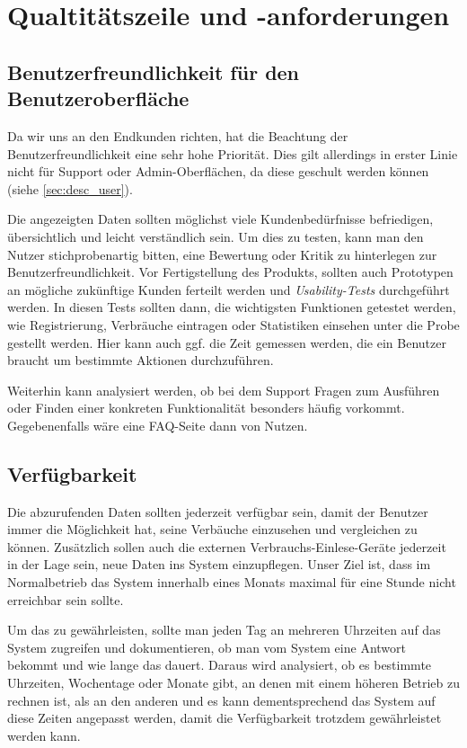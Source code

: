 \section{Qualtitätszeile und -anforderungen}

\subsection{Benutzerfreundlichkeit für den Benutzeroberfläche}
Da wir uns an den Endkunden richten, hat die Beachtung der Benutzerfreundlichkeit eine sehr hohe Priorität. Dies gilt allerdings in erster Linie nicht für Support oder Admin-Oberflächen, da diese geschult werden können (siehe \ref{sec:desc_user}).

Die angezeigten Daten sollten möglichst viele Kundenbedürfnisse
befriedigen, übersichtlich und leicht verständlich sein.
Um dies zu testen, kann man den Nutzer stichprobenartig bitten, eine Bewertung oder Kritik zu hinterlegen zur Benutzerfreundlichkeit.
Vor Fertigstellung des Produkts, sollten auch Prototypen an mögliche zukünftige Kunden ferteilt werden und \textit{Usability-Tests} durchgeführt werden. In diesen Tests sollten dann, die wichtigsten Funktionen getestet werden, wie Registrierung, Verbräuche eintragen oder Statistiken einsehen unter die Probe gestellt werden.
Hier kann auch ggf. die Zeit gemessen werden, die ein Benutzer braucht um bestimmte Aktionen durchzuführen.

Weiterhin kann analysiert werden, ob bei dem Support Fragen zum Ausführen oder Finden einer konkreten Funktionalität besonders häufig vorkommt. Gegebenenfalls wäre eine FAQ-Seite dann von Nutzen.

\subsection{Verfügbarkeit}
Die abzurufenden Daten sollten jederzeit verfügbar sein,
damit der Benutzer immer die Möglichkeit hat,
seine Verbäuche einzusehen und vergleichen zu können. Zusätzlich sollen auch die externen Verbrauchs-Einlese-Geräte jederzeit in der Lage sein, neue Daten ins System einzupflegen.
Unser Ziel ist, dass im Normalbetrieb das System innerhalb eines Monats maximal für eine Stunde nicht erreichbar sein sollte.

Um das zu gewährleisten, sollte man jeden Tag an mehreren Uhrzeiten auf das System zugreifen
und dokumentieren, ob man vom System eine Antwort bekommt und wie lange das dauert.
Daraus wird analysiert, ob es bestimmte Uhrzeiten, Wochentage oder Monate gibt,
an denen mit einem höheren Betrieb zu rechnen ist, als an den anderen und es kann dementsprechend das
System auf diese Zeiten angepasst werden, damit die Verfügbarkeit trotzdem gewährleistet werden kann.


